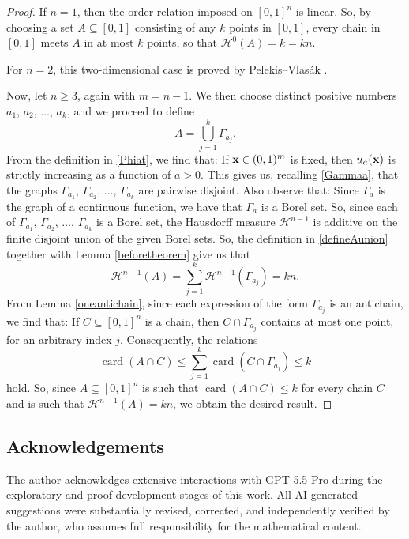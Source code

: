 \documentclass{publicadapt}
\begin{document}
\begin{proof}
 If $n = 1$, then the order relation imposed on $[0, 1]^{n}$ is linear. So, by choosing a set $A \subseteq [0, 1]$ consisting of any $k$ points in $[0, 1]$, every chain in $[0, 1]$ meets $A$ 
 in at most $k$ points, so that $\mathcal{H}^{0}(A) = k = k n$.

 For $n = 2$, this two-dimensional case is proved by Pelekis--Vlas\'ak \cite{PelekisVlasak2020}.

 Now, let $n \geq 3$, again with $m = n - 1$. We then choose distinct positive numbers $a_1$, $a_2$, $\ldots$, $a_k$, and we proceed to define 
\begin{equation}\label{defineAunion}
 A = \bigcup_{j=1}^{k} \Gamma_{a_{j}}. 
\end{equation}
 From the definition in \eqref{Phiat}, we find that: If $\text{{\bf x}} \in (0, 1)^{m}$ is fixed, then $u_{a}(\text{{\bf x}})$ is strictly increasing as a function of $a > 0$. This gives us, 
 recalling \eqref{Gammaa}, that the graphs $\Gamma_{a_{1}}$, $\Gamma_{a_{2}}$, $\ldots$, $\Gamma_{a_{k}}$ are pairwise disjoint. Also observe that: Since $\Gamma_a$ is the graph 
 of a continuous function, we have that $\Gamma_a$ is a Borel set. So, since each of $\Gamma_{a_{1}}$, $\Gamma_{a_{2}}$, $\ldots$, $\Gamma_{a_{k}}$ is a Borel set, the Hausdorff 
 measure $\mathcal{H}^{n-1}$ is additive on the finite disjoint union of the given Borel sets. So, the definition in \eqref{defineAunion} together with Lemma \ref{beforetheorem} give 
 us that $$\mathcal{H}^{n-1}(A) = \sum_{j=1}^{k} \mathcal{H}^{n-1}(\Gamma_{a_{j}}) = k n.$$ From Lemma \ref{oneantichain}, since each expression of the form $\Gamma_{a_{j}}$ 
 is an antichain, we find that: If $C \subseteq [0, 1]^{n}$ is a chain, then $C \cap \Gamma_{a_{j}}$
 contains at most one point, for an arbitrary index $j$. Consequently, the relations
 $$ \operatorname{card}(A \cap C) \leq \sum_{j=1}^{k} \operatorname{card}(C \cap \Gamma_{a_{j}}) \leq k $$
 hold. So, since $A \subseteq [0, 1]^{n}$ is such that 
 $\operatorname{card}(A \cap C) \leq k$ for every chain $C$
 and is such that $\mathcal{H}^{n-1}(A) = k n$, we obtain the desired result. 
 \end{proof}

\subsection*{Acknowledgements}
 The author acknowledges extensive interactions with GPT-5.5 Pro during the exploratory and proof-development stages of this work. All AI-generated suggestions were 
 substantially revised, corrected, and independently verified by the author, who assumes full responsibility for the mathematical content.
\end{document}
